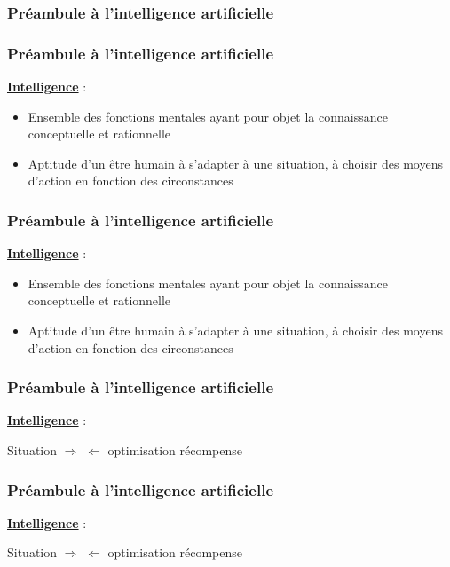 
\begin{frame}
  \frametitle{Préambule à l'intelligence artificielle}
  \begin{center}
    \huge{}
  \end{center}
\end{frame}

\begin{frame}
  \frametitle{Préambule à l'intelligence artificielle}
  \underline{\textbf{Intelligence}} :
  \begin{itemize}
  \item Ensemble des fonctions mentales ayant pour objet la connaissance conceptuelle et rationnelle
  \item Aptitude d'un être humain à s'adapter à une situation, à choisir des moyens d'action en fonction des circonstances
  \end{itemize}
\end{frame}

\begin{frame}
  \frametitle{Préambule à l'intelligence artificielle}
  \underline{\textbf{Intelligence}} :
  \begin{itemize}
  \item Ensemble des fonctions mentales ayant pour objet la connaissance conceptuelle et rationnelle
  \item Aptitude d'un être humain à s'adapter à une situation, à choisir des moyens d'action en fonction des circonstances
  \end{itemize}
  \begin{center}
  \end{center}
\end{frame}

\begin{frame}
  \frametitle{Préambule à l'intelligence artificielle}
  \underline{\textbf{Intelligence}} :
  \newline
  \newline
  \begin{center}
    Situation $\Rightarrow$  $\Leftarrow$ optimisation récompense
  \end{center}
\end{frame}

\begin{frame}
  \frametitle{Préambule à l'intelligence artificielle}
  \underline{\textbf{Intelligence}} :
  \newline
  \newline
  \begin{center}
    Situation $\Rightarrow$  $\Leftarrow$ optimisation récompense
    \newline
    \newline
  \end{center}
\end{frame}

